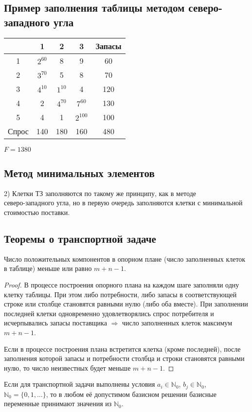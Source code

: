 \documentclass[17pt]{extarticle}
\begin{document}
\subsection{Пример заполнения таблицы методом северо-западного угла}
\begin{center}
    \begin{tabular}{|c|c|c|c|c|}
        \hline
              & 1            & 2            & 3             & Запасы \\
        \hline
        1     & \( 2^{60} \) & 8            & 9             & 60     \\
        \hline
        2     & \( 3^{70} \) & 5            & 8             & 70     \\
        \hline
        3     & \( 4^{10} \) & \( 1^{10} \) & 4             & 120    \\
        \hline
        4     & 2            & \( 4^{70} \) & \( 7^{60} \)  & 130    \\
        \hline
        5     & 4            & 1            & \( 2^{100} \) & 100    \\
        \hline
        Спрос & 140          & 180          & 160           & 480    \\
        \hline
    \end{tabular} $F=1380$
\end{center}

\subsection{Метод минимальных элементов}
2) Клетки ТЗ заполняются по такому же принципу, как в методе \\ северо-западного угла,
но в первую очередь заполняются клетки с минимальной стоимостью поставки.

\subsection{Теоремы о транспортной задаче}
\begin{theorem}
    Число положительных компонентов в опорном плане (число заполненных клеток в таблице) меньше или равно \( m + n - 1 \).
\end{theorem}

\begin{proof}
    В процессе построения опорного плана на каждом шаге заполняли одну клетку таблицы. При этом либо потребности, либо запасы в соответствующей строке или столбце становятся равными нулю (либо оба вместе). При заполнении последней клетки одновременно удовлетворялись спрос потребителя и исчерпывались запасы поставщика \(\Rightarrow\) число заполненных клеток максимум \( m + n - 1 \).

    Если в процессе построения плана встретится клетка (кроме последней), после заполнения которой запасы и потребности столбца и строки становятся равными нулю, то число неизвестных будет меньше \( m + n - 1 \).
\end{proof}

\begin{theorem}
    Если для транспортной задачи выполнены условия \( a_i \in \mathbb{N}_0 \), \( b_j \in \mathbb{N}_0 \), \( \mathbb{N}_0 = \{0, 1, \ldots\} \), то в любом её допустимом базисном решении базисные переменные принимают значения из \( \mathbb{N}_0 \).
\end{theorem}
\end{document}
